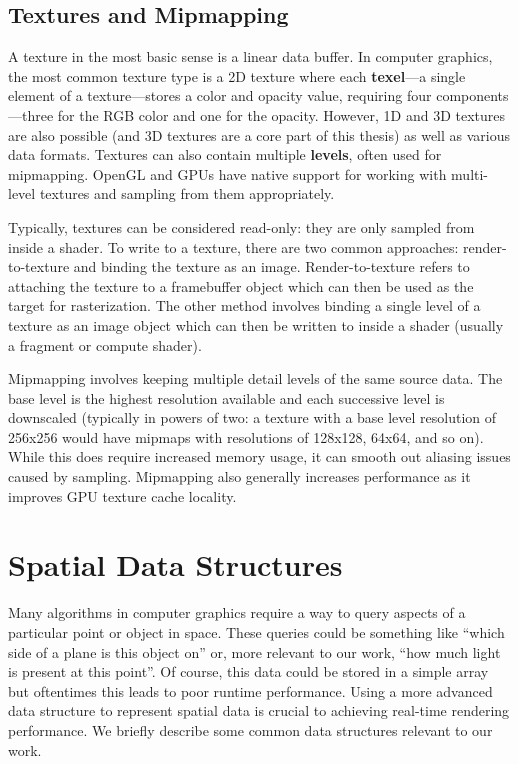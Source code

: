 \subsection{Textures and Mipmapping}
A texture in the most basic sense is a linear data buffer. In computer graphics, the most common texture type is a 2D texture where each \textbf{texel}---a single element of a texture---stores a color and opacity value, requiring four components---three for the RGB color and one for the opacity. However, 1D and 3D textures are also possible (and 3D textures are a core part of this thesis) as well as various data formats. Textures can also contain multiple \textbf{levels}, often used for mipmapping. OpenGL and GPUs have native support for working with multi-level textures and sampling from them appropriately.

Typically, textures can be considered read-only: they are only sampled from inside a shader. To write to a texture, there are two common approaches: render-to-texture and binding the texture as an image. Render-to-texture refers to attaching the texture to a framebuffer object which can then be used as the target for rasterization. The other method involves binding a single level of a texture as an image object which can then be written to inside a shader (usually a fragment or compute shader).

Mipmapping involves keeping multiple detail levels of the same source data. The base level is the highest resolution available and each successive level is downscaled (typically in powers of two: a texture with a base level resolution of 256x256 would have mipmaps with resolutions of 128x128, 64x64, and so on). While this does require increased memory usage, it can smooth out aliasing issues caused by sampling. Mipmapping also generally increases performance as it improves GPU texture cache locality.




\section{Spatial Data Structures}
Many algorithms in computer graphics require a way to query aspects of a particular point or object in space. These queries could be something like ``which side of a plane is this object on'' or, more relevant to our work, ``how much light is present at this point''. Of course, this data could be stored in a simple array but oftentimes this leads to poor runtime performance. Using a more advanced data structure to represent spatial data is crucial to achieving real-time rendering performance. We briefly describe some common data structures relevant to our work.

